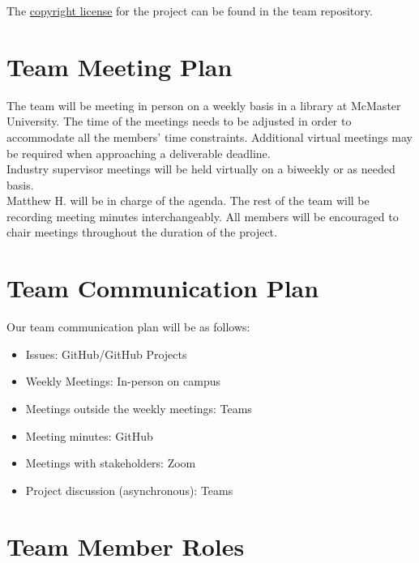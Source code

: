 \documentclass{article}
\begin{document}
The \href{https://github.com/M9Huynh/technically-functional/blob/f05da0acf59e6b8a08d67f9132471c1a17b5afef/LICENSE}{copyright license} for the project can be found in the team repository.

\section{Team Meeting Plan}

The team will be meeting in person on a weekly basis in a library at McMaster University. The time of the meetings
needs to be adjusted in order to accommodate all the members' time constraints.
Additional virtual meetings may be required when approaching a deliverable deadline.\\
Industry supervisor meetings will be held virtually on a biweekly or as needed basis. \\

Matthew H. will be in charge of the agenda. The rest of the team will be recording meeting minutes interchangeably. All members will be encouraged
to chair meetings throughout the duration of the project. 

\section{Team Communication Plan}

Our team communication plan will be as follows:
\begin{itemize}
  \item Issues: GitHub/GitHub Projects
  \item Weekly Meetings: In-person on campus
  \item Meetings outside the weekly meetings: Teams
  \item Meeting minutes: GitHub
  \item Meetings with stakeholders: Zoom
  \item Project discussion (asynchronous): Teams
\end{itemize}


\section{Team Member Roles}
\end{document}
